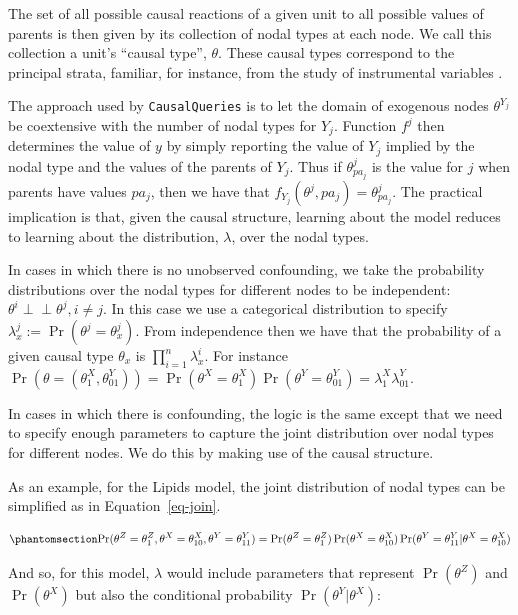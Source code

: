 \documentclass[
  11pt,
  article]{jss}
\begin{document}
The set of all possible causal reactions of a given unit to all possible
values of parents is then given by its collection of nodal types at each
node. We call this collection a unit's ``causal type'', \(\theta\).
These causal types correspond to the principal strata, familiar, for
instance, from the study of instrumental variables
\citep{frangakis_principal_2002}.

The approach used by \texttt{CausalQueries} is to let the domain of
exogenous nodes \(\theta^{Y_j}\) be coextensive with the number of nodal
types for \(Y_j\). Function \(f^j\) then determines the value of \(y\)
by simply reporting the value of \(Y_j\) implied by the nodal type and
the values of the parents of \(Y_j\). Thus if \(\theta^j_{pa_j}\) is the
value for \(j\) when parents have values \(pa_j\), then we have that
\(f_{Y_j}(\theta^{j}, pa_j) = \theta^j_{pa_j}\). The practical
implication is that, given the causal structure, learning about the
model reduces to learning about the distribution, \(\lambda\), over the
nodal types.

In cases in which there is no unobserved confounding, we take the
probability distributions over the nodal types for different nodes to be
independent: \(\theta^i \perp\!\!\! \perp \theta^j, i\neq j\). In this
case we use a categorical distribution to specify
\({\lambda^j_x} := \Pr(\theta^j = {\theta^j_x})\). From independence
then we have that the probability of a given causal type \(\theta_x\) is
\(\prod_{i=1}^n {\lambda^i_x}\). For instance
\(\Pr(\theta = (\theta^X_1, \theta^Y_{01})) = \Pr(\theta^X = \theta^X_1)\Pr(\theta^Y = \theta^Y_{01}) = \lambda^X_1\lambda^Y_{01}\).

In cases in which there is confounding, the logic is the same except
that we need to specify enough parameters to capture the joint
distribution over nodal types for different nodes. We do this by making
use of the causal structure.

As an example, for the Lipids model, the joint distribution of nodal
types can be simplified as in Equation~\ref{eq-join}.

\begin{equation}\phantomsection\label{eq-join}{
\Pr(\theta^Z = \theta^Z_1, \theta^X = \theta^X_{10}, \theta^Y = \theta^Y_{11}) = 
\Pr(\theta^Z = \theta^Z_1)\Pr(\theta^X = \theta^X_{10})\Pr(\theta^Y = \theta^Y_{11}|\theta^X = \theta^X_{10})
}\end{equation}

And so, for this model, \(\lambda\) would include parameters that
represent \(\Pr(\theta^Z)\) and \(\Pr(\theta^X)\) but also the
conditional probability \(\Pr(\theta^Y|\theta^X)\):
\end{document}
